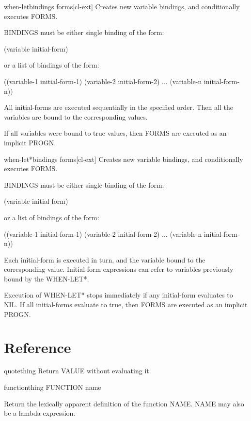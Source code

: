 \documentclass[10pt,english]{book}
\begin{document}
\begin{macro}{when-let}{bindings \body forms}[cl-ext]
  Creates new variable bindings, and conditionally executes FORMS.

BINDINGS must be either single binding of the form:

 (variable initial-form)

or a list of bindings of the form:

 ((variable-1 initial-form-1)
  (variable-2 initial-form-2)
  ...
  (variable-n initial-form-n))

All initial-forms are executed sequentially in the specified order. Then all
the variables are bound to the corresponding values.

If all variables were bound to true values, then FORMS are executed as an
implicit PROGN.
\end{macro}

\begin{macro}{when-let*}{bindings \body forms}[cl-ext]
  Creates new variable bindings, and conditionally executes FORMS.

BINDINGS must be either single binding of the form:

 (variable initial-form)

or a list of bindings of the form:

 ((variable-1 initial-form-1)
  (variable-2 initial-form-2)
  ...
  (variable-n initial-form-n))

Each initial-form is executed in turn, and the variable bound to the
corresponding value. Initial-form expressions can refer to variables
previously bound by the WHEN-LET*.

Execution of WHEN-LET* stops immediately if any initial-form evaluates to NIL.
If all initial-forms evaluate to true, then FORMS are executed as an implicit
PROGN.
\end{macro}

\section{Reference}
\label{sec:reference}

\begin{specialop}{quote}{thing}
Return VALUE without evaluating it.
\end{specialop}

\begin{specialop}{function}{thing}
  FUNCTION name

Return the lexically apparent definition of the function NAME. NAME may also
be a lambda expression.
\end{specialop}
\end{document}

